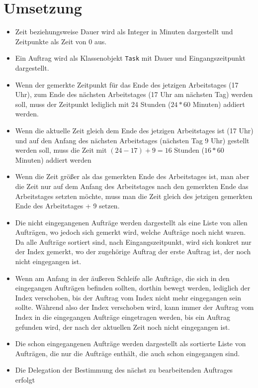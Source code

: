 \documentclass[a4paper,10pt,ngerman]{scrartcl}
\begin{document}
\section{Umsetzung}\label{sec:umsetzung}
\begin{itemize}
	\item Zeit beziehungsweise Dauer wird als Integer in Minuten dargestellt und Zeitpunkte als Zeit von 0 aus.
	\item Ein Auftrag wird als Klassenobjekt \texttt{Task} mit Dauer und Eingangszeitpunkt dargestellt.
	\item Wenn der gemerkte Zeitpunkt für das Ende des jetzigen Arbeitstages (17 Uhr),
	zum Ende des nächsten Arbeitstages (17 Uhr am nächsten Tag)  werden soll,
	muss der Zeitpunkt lediglich mit 24 Stunden ($24 * 60$ Minuten) addiert werden.
	\item Wenn die aktuelle Zeit gleich dem Ende des jetzigen Arbeitstages ist (17 Uhr)
	und auf den Anfang des nächsten Arbeitstages (nächsten Tag 9 Uhr) gestellt werden soll,
	muss die Zeit mit $(24 - 17) + 9 = 16$ Stunden ($16 * 60$ Minuten) addiert werden 
	\item Wenn die Zeit größer als das gemerkten Ende des Arbeitstages ist,
	man aber die Zeit nur auf dem Anfang des Arbeitstages nach den gemerkten Ende das Arbeitstages setzten möchte,
	muss man die Zeit gleich des jetzigen gemerkten Ende des Arbeitstages + 9 setzen.
	\item Die nicht eingegangenen Aufträge werden dargestellt als eine Liste von allen Aufträgen,
	      wo jedoch sich gemerkt wird, welche Aufträge noch nicht waren.
	      Da alle Aufträge sortiert sind, nach Eingangszeitpunkt, wird sich konkret nur der Index gemerkt,
	      wo der zugehörige Auftrag der erste Auftrag ist, der noch nicht eingegangen ist.
	\item Wenn am Anfang in der äußeren Schleife alle Aufträge,
	die sich in den eingegangen Aufträgen befinden sollten, dorthin bewegt werden,
	lediglich der Index verschoben, bis der Auftrag vom Index nicht mehr eingegangen sein sollte.
	Während also der Index verschoben wird,
	kann immer der Auftrag vom Index in die eingegangen Aufträge eingetragen werden,
	bis ein Auftrag gefunden wird,
	der nach der aktuellen Zeit noch nicht eingegangen ist.
	\item Die schon eingegangenen Aufträge werden dargestellt als sortierte Liste von Aufträgen,
	      die nur die Aufträge enthält, die auch schon eingegangen sind.
	\item Die Delegation der Bestimmung des nächst zu bearbeitenden Auftrages erfolgt

\end{itemize}
\end{document}
